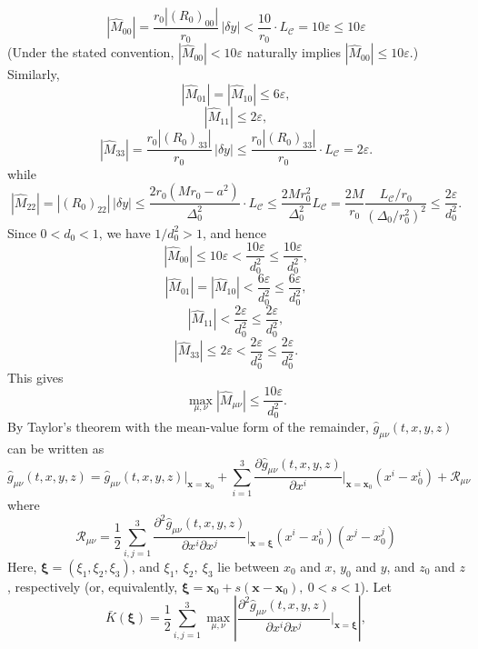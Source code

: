 \documentclass[english]{article}
\begin{document}
\[
\left|\hat{M}_{00}\right|=\frac{r_{0}\left|\left(R_{0}\right)_{00}\right|}{r_{0}}\,\left|\delta y\right|<\frac{10}{r_{0}}\cdot L_{\mathcal{C}}=10\varepsilon\leq10\varepsilon
\]
 (Under the stated convention, $\left|\hat{M}_{00}\right|<10\varepsilon$
naturally implies $\left|\hat{M}_{00}\right|\leq10\varepsilon$.)
Similarly, 
\[
\left|\hat{M}_{01}\right|=\left|\hat{M}_{10}\right|\leq6\varepsilon,
\]
 {}
\[
\left|\hat{M}_{11}\right|\leq2\varepsilon,
\]
 {}
\[
\left|\hat{M}_{33}\right|=\frac{r_{0}\left|\left(R_{0}\right)_{33}\right|}{r_{0}}\,\left|\delta y\right|\leq\frac{r_{0}\left|\left(R_{0}\right)_{33}\right|}{r_{0}}\cdot L_{\mathcal{C}}=2\varepsilon.
\]
 while 
\[
\left|\hat{M}_{22}\right|=\left|\left(R_{0}\right)_{22}\right|\,\left|\delta y\right|\leq\frac{2r_{0}\left(Mr_{0}-a^{2}\right)}{\Delta^{2}_{0}}\cdot L_{\mathcal{C}}\leq\frac{2Mr^{2}_{0}}{\Delta^{2}_{0}}L_{\mathcal{C}}=\frac{2M}{r_{0}}\frac{L_{\mathcal{C}}/r_{0}}{\left(\Delta_{0}/r^{2}_{0}\right)^{2}}\leq\frac{2\varepsilon}{d^{2}_{0}}.
\]
 Since $0<d_{0}<1$, we have $1/d^{2}_{0}>1$, and hence 
\[
\left|\hat{M}_{00}\right|\leq10\varepsilon<\frac{10\varepsilon}{d^{2}_{0}}\leq\frac{10\varepsilon}{d^{2}_{0}},
\]
 {}
\[
\left|\hat{M}_{01}\right|=\left|\hat{M}_{10}\right|<\frac{6\varepsilon}{d^{2}_{0}}\leq\frac{6\varepsilon}{d^{2}_{0}},
\]
 {}
\[
\left|\hat{M}_{11}\right|<\frac{2\varepsilon}{d^{2}_{0}}\leq\frac{2\varepsilon}{d^{2}_{0}},
\]
 {}
\[
\left|\hat{M}_{33}\right|\leq2\varepsilon<\frac{2\varepsilon}{d^{2}_{0}}\leq\frac{2\varepsilon}{d^{2}_{0}}.
\]
 This gives 
\[
\max_{\mu,\nu}\left|\hat{M}_{\mu\nu}\right|\leq\frac{10\varepsilon}{d^{2}_{0}}.
\]
 By Taylor's theorem with the mean-value form of the remainder, $\hat{g}_{\mu\nu}\left(t,x,y,z\right)$
can be written as 
\[
\hat{g}_{\mu\nu}\left(t,x,y,z\right)=\hat{g}_{\mu\nu}\left(t,x,y,z\right)\big|_{\boldsymbol{x}=\boldsymbol{x}_{0}}+\sum^{3}_{i=1}\frac{\partial\hat{g}_{\mu\nu}\left(t,x,y,z\right)}{\partial x^{i}}\Bigg|_{\boldsymbol{x}=\boldsymbol{x}_{0}}\left(x^{i}-x^{i}_{0}\right)+\mathcal{R}_{\mu\nu}
\]
 where 
\[
\mathcal{R}_{\mu\nu}=\frac{1}{2}\sum^{3}_{i,j=1}\frac{\partial^{2}\hat{g}_{\mu\nu}\left(t,x,y,z\right)}{\partial x^{i}\partial x^{j}}\Bigg|_{\boldsymbol{x}=\boldsymbol{\xi}}\left(x^{i}-x^{i}_{0}\right)\left(x^{j}-x^{j}_{0}\right)
\]
 Here, $\boldsymbol{\xi}=\left(\xi_{1},\xi_{2},\xi_{3}\right)$, and
$\xi_{1},\ \xi_{2},\ \xi_{3}$ lie between $x_{0}$ and $x$, $y_{0}$
and $y$, and $z_{0}$ and $z$, respectively (or, equivalently, $\boldsymbol{\xi}=\boldsymbol{x}_{0}+s\left(\boldsymbol{x}-\boldsymbol{x}_{0}\right),\ 0<s<1$).
Let 
\[
\bar{K}(\boldsymbol{\xi})=\frac{1}{2}\sum^{3}_{i,j=1}\max_{\mu,\nu}\left|\frac{\partial^{2}\hat{g}_{\mu\nu}\left(t,x,y,z\right)}{\partial x^{i}\partial x^{j}}\Bigg|_{\boldsymbol{x}=\boldsymbol{\xi}}\right|,
\]
\end{document}
